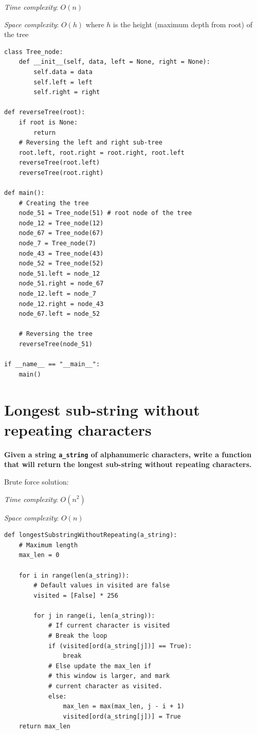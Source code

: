 \documentclass[a4paper,11pt]{book}
\begin{document}
\noindent \textit{Time complexity}: $O(n)$

\noindent \textit{Space complexity}: $O(h)$ where $h$ is the height (maximum depth from root) of the tree

\begin{lstlisting}
class Tree_node:
    def __init__(self, data, left = None, right = None):
        self.data = data
        self.left = left
        self.right = right
    
def reverseTree(root):
	if root is None:
		return
	# Reversing the left and right sub-tree
	root.left, root.right = root.right, root.left
	reverseTree(root.left)
	reverseTree(root.right)
    
def main():
	# Creating the tree
	node_51 = Tree_node(51) # root node of the tree
	node_12 = Tree_node(12)
	node_67 = Tree_node(67)
	node_7 = Tree_node(7)
	node_43 = Tree_node(43)
	node_52 = Tree_node(52)
	node_51.left = node_12
	node_51.right = node_67
	node_12.left = node_7
	node_12.right = node_43
	node_67.left = node_52

	# Reversing the tree
	reverseTree(node_51)

if __name__ == "__main__":
	main()
\end{lstlisting}

\newpage
\section{Longest sub-string without repeating characters}

\noindent \textbf{Given a string \lstinline{a_string} of alphanumeric characters, write a function that will return the longest sub-string without repeating characters.}
\vspace{5mm}

\noindent Brute force solution:

\noindent \textit{Time complexity}: $O(n^2)$

\noindent \textit{Space complexity}: $O(n)$

\begin{lstlisting}
def longestSubstringWithoutRepeating(a_string):    
    # Maximum length
    max_len = 0
  
    for i in range(len(a_string)):
        # Default values in visited are false
        visited = [False] * 256  
  
        for j in range(i, len(a_string)):
            # If current character is visited
            # Break the loop
            if (visited[ord(a_string[j])] == True):
                break
            # Else update the max_len if
            # this window is larger, and mark
            # current character as visited.
            else:
                max_len = max(max_len, j - i + 1)
                visited[ord(a_string[j])] = True
    return max_len
\end{lstlisting}
\end{document}
